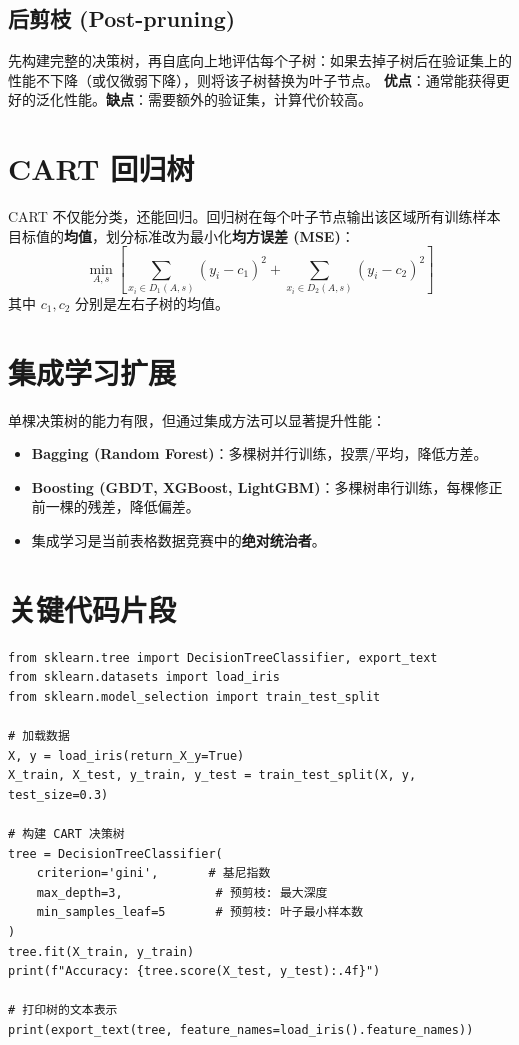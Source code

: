 \documentclass[12pt, a4paper]{article}
\begin{document}
\subsection{后剪枝 (Post-pruning)}
先构建完整的决策树，再自底向上地评估每个子树：如果去掉子树后在验证集上的性能不下降（或仅微弱下降），则将该子树替换为叶子节点。
\textbf{优点}：通常能获得更好的泛化性能。\textbf{缺点}：需要额外的验证集，计算代价较高。

\section{CART 回归树}
CART 不仅能分类，还能回归。回归树在每个叶子节点输出该区域所有训练样本目标值的\textbf{均值}，划分标准改为最小化\textbf{均方误差 (MSE)}：
$$ \min_{A, s} \left[ \sum_{x_i \in D_1(A,s)} (y_i - c_1)^2 + \sum_{x_i \in D_2(A,s)} (y_i - c_2)^2 \right] $$
其中 $c_1, c_2$ 分别是左右子树的均值。

\section{集成学习扩展}
单棵决策树的能力有限，但通过集成方法可以显著提升性能：
\begin{itemize}
    \item \textbf{Bagging (Random Forest)}：多棵树并行训练，投票/平均，降低方差。
    \item \textbf{Boosting (GBDT, XGBoost, LightGBM)}：多棵树串行训练，每棵修正前一棵的残差，降低偏差。
    \item 集成学习是当前表格数据竞赛中的\textbf{绝对统治者}。
\end{itemize}

\section{关键代码片段}
\begin{lstlisting}
from sklearn.tree import DecisionTreeClassifier, export_text
from sklearn.datasets import load_iris
from sklearn.model_selection import train_test_split

# 加载数据
X, y = load_iris(return_X_y=True)
X_train, X_test, y_train, y_test = train_test_split(X, y, test_size=0.3)

# 构建 CART 决策树
tree = DecisionTreeClassifier(
    criterion='gini',       # 基尼指数
    max_depth=3,             # 预剪枝: 最大深度
    min_samples_leaf=5       # 预剪枝: 叶子最小样本数
)
tree.fit(X_train, y_train)
print(f"Accuracy: {tree.score(X_test, y_test):.4f}")

# 打印树的文本表示
print(export_text(tree, feature_names=load_iris().feature_names))
\end{lstlisting}
\end{document}
